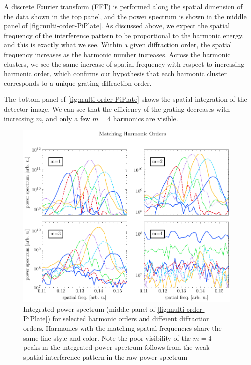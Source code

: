 A discrete Fourier transform (FFT) is performed along the spatial dimension of the data shown in the top panel, and the power spectrum is shown in the middle panel of \cref{fig:multi-order-PiPlate}. As discussed above, we expect the spatial frequency of the interference pattern to be proportional to the harmonic energy, and this is exactly what we see. Within a given diffraction order, the spatial frequency increases as the harmonic number increases. Across the harmonic clusters, we see the same increase of spatial frequency with respect to increasing harmonic order, which confirms our hypothesis that each harmonic cluster corresponds to a unique grating diffraction order.

The bottom panel of \cref{fig:multi-order-PiPlate} shows the spatial integration of the detector image. We can see that the efficiency of the grating decreases with increasing $m$, and only a few $m=4$ harmonics are visible.

\begin{figure}
	\centering
	\includegraphics[width=1.0\textwidth]{figures/chap2/twosource-matching-HO.pdf}
	\caption{Integrated power spectrum (middle panel of \cref{fig:multi-order-PiPlate}) for selected harmonic orders and different diffraction orders. Harmonics with the matching spatial frequencies share the same line style and color. Note the poor visibility of the $m=4$ peaks in the integrated power spectrum follows from the weak spatial interference pattern in the raw power spectrum.}
	\label{fig:twosource-matching-HO}
\end{figure}

